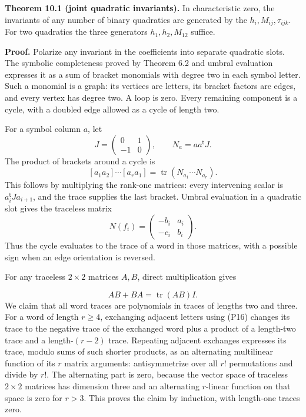 \documentclass[
]{article}
\begin{document}
\protect{}\label{theorem-10-1}{}

\textbf{Theorem 10.1 (joint quadratic invariants).} In characteristic
zero, the invariants of any number of binary quadratics are generated by
the \(h_i,M_{ij},\tau_{ijk}\). For two quadratics the three generators
\(h_1,h_2,M_{12}\) suffice.

\textbf{Proof.} Polarize any invariant in the coefficients into separate
quadratic slots. The symbolic completeness proved by Theorem 6.2 and
umbral evaluation expresses it as a sum of bracket monomials with degree
two in each symbol letter. Such a monomial is a graph: its vertices are
letters, its bracket factors are edges, and every vertex has degree two.
A loop is zero. Every remaining component is a cycle, with a doubled
edge allowed as a cycle of length two.

For a symbol column \(a\), let \[
J=\begin{pmatrix}0&1\\-1&0\end{pmatrix},\qquad
N_a=aa^{\mathsf t}J.
\] The product of brackets around a cycle is \[
[a_1a_2]\cdots [a_ra_1]
=\operatorname{tr}(N_{a_1}\cdots N_{a_r}).
\] This follows by multiplying the rank-one matrices: every intervening
scalar is \(a_i^{\mathsf t}Ja_{i+1}\), and the trace supplies the last
bracket. Umbral evaluation in a quadratic slot gives the traceless
matrix \[
N(f_i)=\begin{pmatrix}-b_i&a_i\\-c_i&b_i\end{pmatrix}.
\] Thus the cycle evaluates to the trace of a word in those matrices,
with a possible sign when an edge orientation is reversed.

For any traceless \(2\times2\) matrices \(A,B\), direct multiplication
gives \protect{}\label{equation-P16}{}

\[
AB+BA=\operatorname{tr}(AB)I.
\tag{P16}
\] We claim that all word traces are polynomials in traces of lengths
two and three. For a word of length \(r\geq4\), exchanging adjacent
letters using (P16) changes its trace to the negative trace of the
exchanged word plus a product of a length-two trace and a
length-\((r-2)\) trace. Repeating adjacent exchanges expresses its
trace, modulo sums of such shorter products, as an alternating
multilinear function of its \(r\) matrix arguments: antisymmetrize over
all \(r!\) permutations and divide by \(r!\). The alternating part is
zero, because the vector space of traceless \(2\times2\) matrices has
dimension three and an alternating \(r\)-linear function on that space
is zero for \(r>3\). This proves the claim by induction, with length-one
traces zero.
\end{document}
